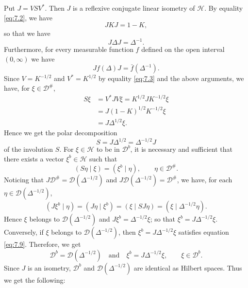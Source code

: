 \documentclass[12pt,b5paper,twoside]{article}
\theoremstyle{takesaki}
\numberwithin{equation}{section}
\begin{document}
Put $J=VSV^*$.  Then $J$ is a reflexive conjugate linear isometry of
$\mathcal H$.  By equality \eqref{eq:7.2}, we have
\[
 JKJ=1-K,
\]
so that we have
\begin{equation}
 J\Delta J=\Delta^{-1}.
 \tag{7.7}\label{eq:7.7}
\end{equation}
Furthermore, for every measurable function $f$ defined on the open
interval $(0,\infty)$ we have
\begin{equation}
 Jf(\Delta)J=\bar f(\Delta^{-1}).
 \tag{7.7$'$}\label{eq:7.7-prime}
\end{equation}
Since $V=K^{-1/2}$ and $V^*=K^{1/2}$ by equality \eqref{eq:7.3} and
the above arguments, we have, for $\xi\in\mathcal D^\#$,
\begin{align*}
 S\xi
  &=V^*JV\xi=K^{1/2}JK^{-1/2}\xi\\
  &=J(1-K)^{1/2}K^{-1/2}\xi\\
  &=J\Delta^{1/2}\xi.
\end{align*}
Hence we get the polar decomposition
\begin{equation}
 S=J\Delta^{1/2}=\Delta^{-1/2}J
 \tag{7.8}\label{eq:7.8}
\end{equation}
of the involution $S$.  For $\xi\in\mathcal H$ to be in
$\mathcal D^b$, it is necessary and sufficient that there exists a
vector $\xi^b\in\mathcal H$ such that
\begin{equation}
 (S\eta\mid\xi)=(\xi^b\mid\eta),
 \qquad\eta\in\mathcal D^\#.
 \tag{7.9}\label{eq:7.9}
\end{equation}
Noticing that $J\mathcal D^\#=\mathcal D(\Delta^{-1/2})$ and
$J\mathcal D(\Delta^{-1/2})=\mathcal D^\#$, we have, for each
$\eta\in\mathcal D(\Delta^{-1/2})$,
\[
 (J\xi^b\mid\eta)=(J\eta\mid\xi^b)
 =(\xi\mid SJ\eta)=(\xi\mid\Delta^{-1/2}\eta).
\]
Hence $\xi$ belongs to $\mathcal D(\Delta^{-1/2})$ and
$J\xi^b=\Delta^{-1/2}\xi$; so that
$\xi^b=J\Delta^{-1/2}\xi$.  Conversely, if $\xi$ belongs to
$\mathcal D(\Delta^{-1/2})$, then
$\xi^b=J\Delta^{-1/2}\xi$ satisfies equation \eqref{eq:7.9}.
Therefore, we get
\[
 \mathcal D^b=\mathcal D(\Delta^{-1/2})
 \quad\text{and}\quad
 \xi^b=J\Delta^{-1/2}\xi,
 \qquad\xi\in\mathcal D^b.
\]
Since $J$ is an isometry, $\mathcal D^b$ and
$\mathcal D(\Delta^{-1/2})$ are identical as Hilbert spaces.  Thus we
get the following:
\end{document}
